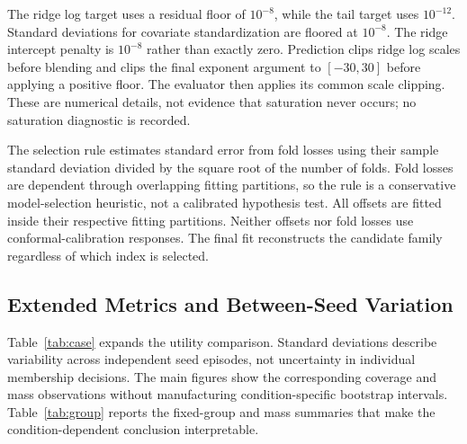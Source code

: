 \documentclass{article}
\begin{document}
The ridge log target uses a residual floor of $10^{-8}$, while the tail target uses $10^{-12}$. Standard deviations for covariate standardization are floored at $10^{-8}$. The ridge intercept penalty is $10^{-8}$ rather than exactly zero. Prediction clips ridge log scales before blending and clips the final exponent argument to $[-30,30]$ before applying a positive floor. The evaluator then applies its common scale clipping. These are numerical details, not evidence that saturation never occurs; no saturation diagnostic is recorded.

The selection rule estimates standard error from fold losses using their sample standard deviation divided by the square root of the number of folds. Fold losses are dependent through overlapping fitting partitions, so the rule is a conservative model-selection heuristic, not a calibrated hypothesis test. All offsets are fitted inside their respective fitting partitions. Neither offsets nor fold losses use conformal-calibration responses. The final fit reconstructs the candidate family regardless of which index is selected.

\subsection{Extended Metrics and Between-Seed Variation}
Table~\ref{tab:case} expands the utility comparison. Standard deviations describe variability across independent seed episodes, not uncertainty in individual membership decisions. The main figures show the corresponding coverage and mass observations without manufacturing condition-specific bootstrap intervals. Table~\ref{tab:group} reports the fixed-group and mass summaries that make the condition-dependent conclusion interpretable.
\end{document}
